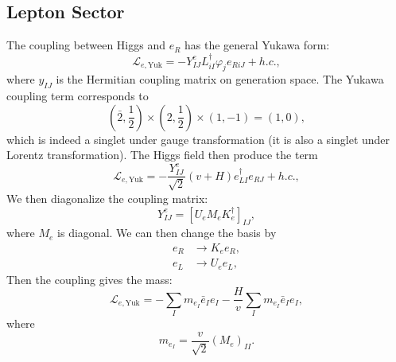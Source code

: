 \subsection{Lepton Sector}
The coupling between Higgs and $e_R$ has the general Yukawa form:
\begin{equation}
	\mathcal L_{e,\mathrm{Yuk}} = -Y^e_{IJ} L_{iI}^\dagger \varphi_j e_{R iJ} + h.c.,
\end{equation}
where $y_{IJ}$ is the Hermitian coupling matrix on generation space.
The Yukawa coupling term corresponds to
\begin{equation}
	\left(\bar 2, \frac{1}{2}\right) \times \left(2, \frac{1}{2}\right) \times \left(1, -1\right) = \left(1,0\right),
\end{equation}
which is indeed a singlet under gauge transformation (it is also a singlet under Lorentz transformation).
The Higgs field then produce the term
\begin{equation}
	\mathcal L_{e,\mathrm{Yuk}} = -\frac{Y^e_{IJ}}{\sqrt 2}(v+H) e_{LI}^\dagger e_{RJ} + h.c.,
\end{equation}
We then diagonalize the coupling matrix:
\begin{equation}
	 Y^e_{IJ} = \left[U_{e} M_e K^\dagger_{e}\right]_{IJ},
\end{equation}
where $M_e$ is diagonal.
We can then change the basis by
\begin{equation}
\begin{aligned}
	e_R &\rightarrow K_e e_R, \\
	e_L &\rightarrow U_e e_L,
\end{aligned}
\end{equation}
Then the coupling gives the mass:
\begin{equation}
	\mathcal L_{e,\mathrm{Yuk}} 
	= - \sum_I m_{e_I} \bar e_I e_I - \frac{H}{v}\sum_I m_{e_I} \bar e_I e_I,
\end{equation}
where
\begin{equation}
	m_{e_I} = \frac{v}{\sqrt 2} (M_e)_{II}.
\end{equation}


